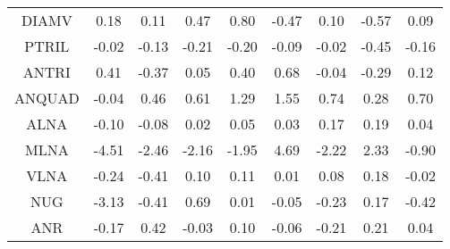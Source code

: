 \begin{longtable}{ | c || c | c | c | c | c | c | c || c |}
DIAMV &  \cellcolor[HTML]{F7F7FF} 0.18 &  \cellcolor[HTML]{FFFFFF} 0.11 &  \cellcolor[HTML]{F7F7FF} 0.47 &  \cellcolor[HTML]{E7E7FF} 0.80 &  \cellcolor[HTML]{FFF7F7} -0.47 &  \cellcolor[HTML]{FFFFFF} 0.10 &  \cellcolor[HTML]{FFEFEF} -0.57 &  \cellcolor[HTML]{FFFFFF} 0.09 \\
PTRIL &  \cellcolor[HTML]{FFFFFF} -0.02 &  \cellcolor[HTML]{FFFFFF} -0.13 &  \cellcolor[HTML]{FFF7F7} -0.21 &  \cellcolor[HTML]{FFF7F7} -0.20 &  \cellcolor[HTML]{FFFFFF} -0.09 &  \cellcolor[HTML]{FFFFFF} -0.02 &  \cellcolor[HTML]{FFF7F7} -0.45 &  \cellcolor[HTML]{FFF7F7} -0.16 \\
ANTRI &  \cellcolor[HTML]{F7F7FF} 0.41 &  \cellcolor[HTML]{FFF7F7} -0.37 &  \cellcolor[HTML]{FFFFFF} 0.05 &  \cellcolor[HTML]{F7F7FF} 0.40 &  \cellcolor[HTML]{EFEFFF} 0.68 &  \cellcolor[HTML]{FFFFFF} -0.04 &  \cellcolor[HTML]{FFF7F7} -0.29 &  \cellcolor[HTML]{FFFFFF} 0.12 \\
ANQUAD &  \cellcolor[HTML]{FFFFFF} -0.04 &  \cellcolor[HTML]{F7F7FF} 0.46 &  \cellcolor[HTML]{EFEFFF} 0.61 &  \cellcolor[HTML]{DFDFFF} 1.29 &  \cellcolor[HTML]{D7D7FF} 1.55 &  \cellcolor[HTML]{EFEFFF} 0.74 &  \cellcolor[HTML]{F7F7FF} 0.28 &  \cellcolor[HTML]{EFEFFF} 0.70 \\
ALNA &  \cellcolor[HTML]{FFFFFF} -0.10 &  \cellcolor[HTML]{FFFFFF} -0.08 &  \cellcolor[HTML]{FFFFFF} 0.02 &  \cellcolor[HTML]{FFFFFF} 0.05 &  \cellcolor[HTML]{FFFFFF} 0.03 &  \cellcolor[HTML]{F7F7FF} 0.17 &  \cellcolor[HTML]{F7F7FF} 0.19 &  \cellcolor[HTML]{FFFFFF} 0.04 \\
MLNA &  \cellcolor[HTML]{FF8F8F} -4.51 &  \cellcolor[HTML]{FFBFBF} -2.46 &  \cellcolor[HTML]{FFC7C7} -2.16 &  \cellcolor[HTML]{FFCFCF} -1.95 &  \cellcolor[HTML]{8787FF} 4.69 &  \cellcolor[HTML]{FFC7C7} -2.22 &  \cellcolor[HTML]{C7C7FF} 2.33 &  \cellcolor[HTML]{FFE7E7} -0.90 \\
VLNA &  \cellcolor[HTML]{FFF7F7} -0.24 &  \cellcolor[HTML]{FFF7F7} -0.41 &  \cellcolor[HTML]{FFFFFF} 0.10 &  \cellcolor[HTML]{FFFFFF} 0.11 &  \cellcolor[HTML]{FFFFFF} 0.01 &  \cellcolor[HTML]{FFFFFF} 0.08 &  \cellcolor[HTML]{F7F7FF} 0.18 &  \cellcolor[HTML]{FFFFFF} -0.02 \\
NUG &  \cellcolor[HTML]{FFAFAF} -3.13 &  \cellcolor[HTML]{FFF7F7} -0.41 &  \cellcolor[HTML]{EFEFFF} 0.69 &  \cellcolor[HTML]{FFFFFF} 0.01 &  \cellcolor[HTML]{FFFFFF} -0.05 &  \cellcolor[HTML]{FFF7F7} -0.23 &  \cellcolor[HTML]{F7F7FF} 0.17 &  \cellcolor[HTML]{FFF7F7} -0.42 \\
ANR &  \cellcolor[HTML]{FFF7F7} -0.17 &  \cellcolor[HTML]{F7F7FF} 0.42 &  \cellcolor[HTML]{FFFFFF} -0.03 &  \cellcolor[HTML]{FFFFFF} 0.10 &  \cellcolor[HTML]{FFFFFF} -0.06 &  \cellcolor[HTML]{FFF7F7} -0.21 &  \cellcolor[HTML]{F7F7FF} 0.21 &  \cellcolor[HTML]{FFFFFF} 0.04 \\

\end{longtable}
